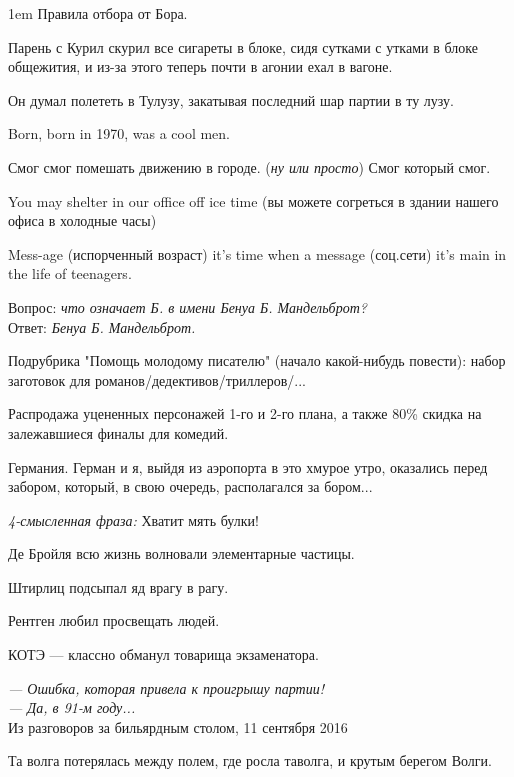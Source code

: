 \begin{flushleft}\parskip1em
Правила отбора от Бора.

Парень с Курил скурил все сигареты в блоке, сидя сутками с утками в блоке общежития, и из-за этого теперь почти в агонии ехал в вагоне.

Он думал полететь в Тулузу, закатывая последний шар партии в ту лузу.

Born, born in 1970, was a cool men.

Смог смог помешать движению в городе. (\emph{ну или просто}) Смог который смог.

You may shelter in our office off ice time (вы можете согреться в здании нашего офиса в холодные часы)

Mess-age (испорченный возраст) it's time when a message (соц.сети) it's main in the life of teenagers.

Вопрос: \emph{что означает Б. в имени Бенуа Б. Мандельброт?}\\
Ответ: \emph{Бенуа Б. Мандельброт.}

Подрубрика "Помощь молодому писателю" (начало какой-нибудь повести): набор заготовок для романов/дедективов/триллеров/...

Распродажа уцененных персонажей 1-го и 2-го плана, а также 80\% скидка на залежавшиеся финалы для комедий.

Германия. Герман и я, выйдя из аэропорта в это хмурое утро, оказались перед забором, который, в свою очередь, располагался за бором...

\emph{4-смысленная фраза:} Хватит мять булки!


Де Бройля всю жизнь волновали элементарные частицы.


Штирлиц подсыпал яд врагу в рагу.


Рентген любил просвещать людей.


КОТЭ --- классно обманул товарища экзаменатора.


\emph{--- Ошибка, которая привела к проигрышу партии!\\
--- Да, в 91-м году...}\\
Из разговоров за бильярдным столом, 11 сентября 2016 


Та волга потерялась между полем, где росла таволга, и крутым берегом Волги. %
\end{flushleft}

